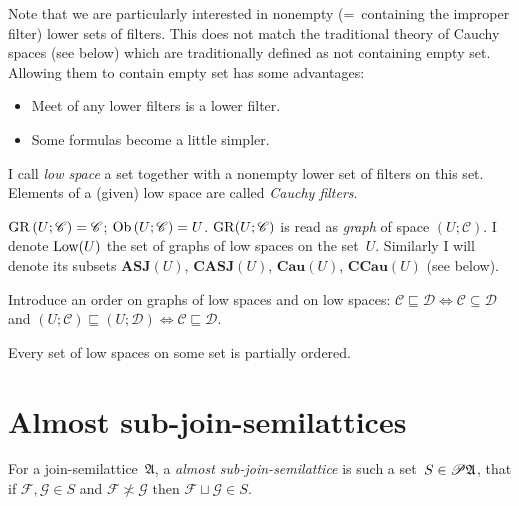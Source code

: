 \begin{rem}
Note that we are particularly interested in nonempty (=~containing the improper filter) lower sets of filters.
This does not match the traditional theory of Cauchy spaces (see below) which are traditionally defined as not containing empty set.
Allowing them to contain empty set has some advantages:
\begin{itemize}
\item Meet of any lower filters is a lower filter.
\item Some formulas become a little simpler.
\end{itemize}
\end{rem}


\begin{defn}
  I call \emph{low space} a set together with a nonempty lower set of
  filters on this set.
  Elements of a (given) low space are called \emph{Cauchy filters}.
\end{defn}

\begin{defn}
  $\operatorname{GR} \left( U ; \mathscr{C} \right) = \mathscr{C}$; $\operatorname{Ob} \left(
  U ; \mathscr{C} \right) = U$.
  $\operatorname{GR} (U; \mathscr{C})$ is read as \emph{graph} of space $(U; \mathscr{C})$.
  I denote $\operatorname{Low}(U)$ the set of graphs of low spaces on the set~$U$.
  Similarly I will denote its subsets $\mathbf{ASJ}(U)$, $\mathbf{CASJ}(U)$, $\mathbf{Cau}(U)$, $\mathbf{CCau}(U)$ (see below).
\end{defn}

\begin{defn}
  Introduce an order on graphs of low spaces and on low spaces:
  $\mathscr{C}\sqsubseteq\mathscr{D}\Leftrightarrow\mathscr{C}\subseteq\mathscr{D}$ and
  $\left( U ; \mathscr{C} \right) \sqsubseteq \left( U ; \mathscr{D} \right) \Leftrightarrow \mathscr{C} \sqsubseteq \mathscr{D}$.
\end{defn}

\begin{obvious}
Every set of low spaces on some set is partially ordered.
\end{obvious}

\section{Almost sub-join-semilattices}


\begin{defn}
For a join-semilattice~$\mathfrak{A}$, a \emph{almost sub-join-semilattice} is such a set~$S\in\mathscr{P}\mathfrak{A}$, that
if $\mathcal{F},\mathcal{G}\in S$ and $\mathcal{F} \nasymp \mathcal{G}$ then $\mathcal{F} \sqcup \mathcal{G}\in S$.
\end{defn}

